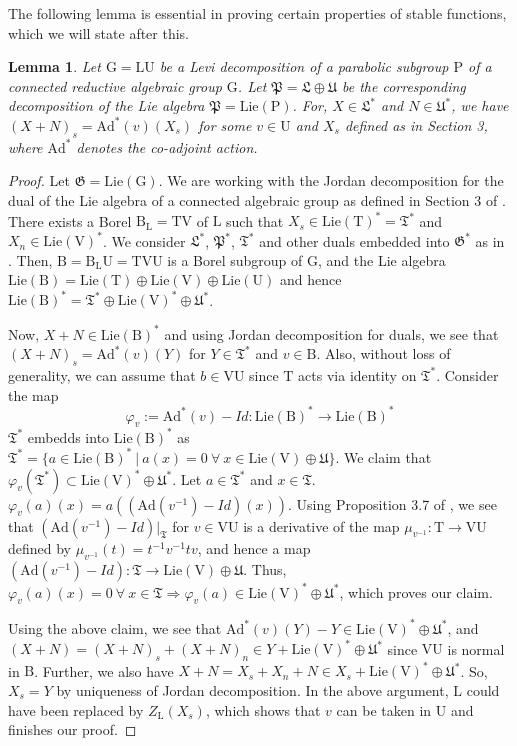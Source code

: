 \documentclass[11 pt]{article}
\numberwithin{equation}{subsection}
\newtheorem{lemma}[theorem]{Lemma}
\theoremstyle{definition}
\theoremstyle{remark}
\theoremstyle{conjecture}
\newcommand{\rG}{\mathrm G}
\newcommand{\rP}{\mathrm P}
\newcommand{\rL}{\mathrm L}
\newcommand{\rU}{\mathrm U}
\newcommand{\rT}{\mathrm T}
\newcommand{\rB}{\mathrm B}
\newcommand{\rV}{\mathrm V}
\newcommand{\Lie}{\mathrm{Lie}}
\newcommand{\Ad}{\mathrm{Ad}}
\newcommand{\mf}{\mathfrak}
\begin{document}
The following lemma is essential in proving certain properties of stable functions, which we will state after this. 
\begin{lemma}\label{lemmaresstable}
    Let $\rG= \rL \rU$ be a Levi decomposition of a parabolic subgroup $\rP$ of a connected reductive algebraic group $\rG$. Let $\mf P = \mf L\oplus \mf U$ be the corresponding decomposition of the Lie algebra $\mf P= \Lie(\rP)$. For, $X\in \mf L^*$ and $N\in \mf U^*$, we have $(X+N)_s=\Ad^*(v)(X_s)$ for some $v \in \rU$ and $X_s$ defined as in \cite{KW1} Section 3, where $\Ad^*$ denotes the co-adjoint action. 
\end{lemma}
\begin{proof}
    Let $\mf G= \Lie (\rG)$. We are working with the Jordan decomposition for the dual of the Lie algebra of a connected algebraic group as defined in Section 3 of \cite{KW1}. There exists a Borel $\rB_{\rL}=\rT\rV$ of $\rL$ such that $X_s\in \Lie(\rT)^*=\mf T^*$ and $X_n\in \Lie(\rV)^*$. We consider $\mf L^*$, $\mf P^*$, $\mf T^*$ and other duals embedded into $\mf G^*$ as in \cite{KW1}. Then, $\rB=\rB_\rL\rU=\rT\rV\rU$ is a Borel subgroup of $\rG$, and the Lie algebra $\Lie(\rB)=\Lie(\rT)\oplus\Lie(\rV)\oplus\Lie(\rU)$ and hence $\Lie(\rB)^*=\mf T^*\oplus \Lie(\rV)^*\oplus\mf U^*$. \par
    Now, $X+N\in \Lie(\rB)^*$ and using Jordan decomposition for duals, we see that $(X+N)_s=\Ad^*(v)(Y)$ for $Y \in \mf T^*$ and $v \in \rB$. Also, without loss of generality, we can assume that $b \in \rV\rU$ since $\rT$ acts via identity on $\mf T^*$. Consider the map 
    \begin{equation*}
        \varphi_v:= \Ad^*(v)-Id : \Lie(\rB)^* \longrightarrow \Lie(\rB)^*
    \end{equation*}
    $\mf T^*$ embedds into $\Lie(\rB)^*$ as $\mf T^*=\{a \in \Lie(\rB)^* \:|\: a(x)=0\: \forall \: x \in \Lie(\rV) \oplus \mf U\}$. We claim that $\varphi_v(\mf T^*) \subset  \Lie(\rV)^* \oplus \mf U^*$. Let $a \in \mf T^*$ and $x \in \mf T$. $\varphi_v(a)(x)=a ((\Ad(v^{-1})-Id)(x))$. Using Proposition 3.7 of \cite{Le}, we see that $(\Ad(v^{-1})-Id)|_{\mf T}$ for $v \in \rV\rU$ is a derivative of the map $\mu_{v^{-1}}:\rT \rightarrow \rV \rU$ defined by $\mu_{v^{-1}}(t)= t^{-1}v^{-1}tv$, and hence a map $(\Ad(v^{-1})-Id):\mf T\rightarrow \Lie(\rV)\oplus \mf U$. Thus, $\varphi_v(a)(x)= 0 \: \forall\: x \in \mf T \Rightarrow \varphi_v(a) \in \Lie(\rV)^* \oplus \mf U^*$, which proves our claim. \par
    Using the above claim, we see that $\Ad^*(v)(Y)-Y \in \Lie(\rV)^* \oplus \mf U^*$, and $(X+N)= (X+N)_s + (X+N)_n \in Y + \Lie(\rV)^* \oplus \mf U^*$ since $\rV\rU $ is normal in $\rB$. Further, we also have $X +N = X_s+X_n+ N\in X_s + \Lie(\rV)^* \oplus \mf U^*$. So, $X_s=Y$ by uniqueness of Jordan decomposition. In the above argument, $\rL$ could have been replaced by $Z_\rL(X_s)$, which shows that $v$ can be taken in $\rU$ and finishes our proof. 
\end{proof}
\end{document}

